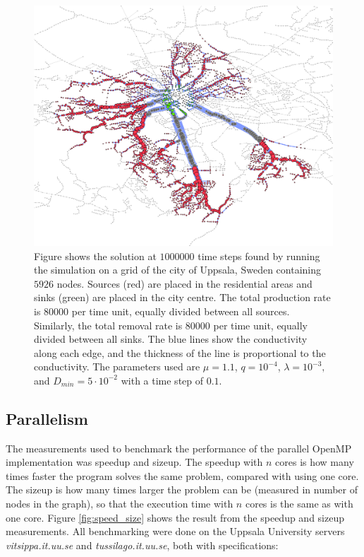 \begin{figure}
\centering
\includegraphics[width=\textwidth]{img/uppsala.png}
\caption{Figure shows the solution at $1000000$ time steps found by running the simulation on a grid of the city of Uppsala, Sweden containing $5926$ nodes. Sources (red) are placed in the residential areas and sinks (green) are placed in the city centre. The total production rate is $80000$ per time unit, equally divided between all sources. Similarly, the total removal rate is $80000$ per time unit, equally divided between all sinks. The blue lines show the conductivity along each edge, and the thickness of the line is proportional to the conductivity. The parameters used are $\mu = 1.1$, $q = 10^{-4}$, $\lambda = 10^{-3},$ and $D_{min}=5 \cdot 10^{-2}$ with a time step of $0.1$.}
\label{fig:uppsala}
\end{figure}

\subsection{Parallelism}
The measurements used to benchmark the performance of the parallel OpenMP implementation was speedup and sizeup. The speedup with $n$ cores is how many times faster the program solves the same problem, compared with using one core. The sizeup is how many times larger the problem can be (measured in number of nodes in the graph), so that the execution time with $n$ cores is the same as with one core. Figure \ref{fig:speed_size} shows the result from the speedup and sizeup measurements. All benchmarking were done on the Uppsala University servers \textit{vitsippa.it.uu.se} and \textit{tussilago.it.uu.se}, both with specifications: 


